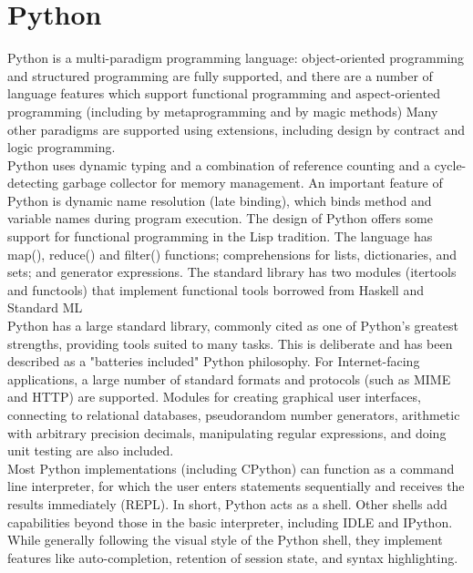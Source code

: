 \documentclass[a4paper,12pt]{report}
\begin{document}
\section{Python}
Python is a multi-paradigm programming language: object-oriented programming and structured programming are fully supported, and there are a number of language features which support functional programming and aspect-oriented programming (including by metaprogramming and by magic methods) Many other paradigms are supported using extensions, including design by contract and logic programming. \\
\hspace*{\parindent}Python uses dynamic typing and a combination of reference counting and a cycle-detecting garbage collector for memory management. An important feature of Python is dynamic name resolution (late binding), which binds method and variable names during program execution. The design of Python offers some support for functional programming in the Lisp tradition. The language has map(), reduce() and filter() functions; comprehensions for lists, dictionaries, and sets; and generator expressions. The standard library has two modules (itertools and functools) that implement functional tools borrowed from Haskell and Standard ML\\
\hspace*{\parindent}Python has a large standard library, commonly cited as one of Python's greatest strengths, providing tools suited to many tasks. This is deliberate and has been described as a "batteries included" Python philosophy. For Internet-facing applications, a large number of standard formats and protocols (such as MIME and HTTP) are supported. Modules for creating graphical user interfaces, connecting to relational databases, pseudorandom number generators, arithmetic with arbitrary precision decimals, manipulating regular expressions, and doing unit testing are also included.\\
\hspace*{\parindent}	Most Python implementations (including CPython) can function as a command line interpreter, for which the user enters statements sequentially and receives the results immediately (REPL). In short, Python acts as a shell.
Other shells add capabilities beyond those in the basic interpreter, including IDLE and IPython. While generally following the visual style of the Python shell, they implement features like auto-completion, retention of session state, and syntax highlighting.
\end{document}
